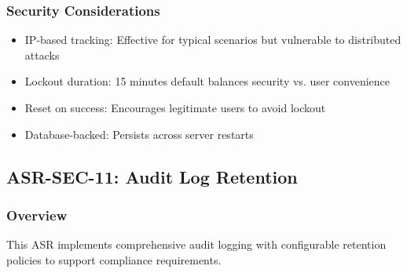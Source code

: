 \documentclass[12pt,oneside,a4paper]{article}
\begin{document}
\subsubsection{Security Considerations}
\begin{itemize}
    \item IP-based tracking: Effective for typical scenarios but vulnerable to distributed attacks
    \item Lockout duration: 15 minutes default balances security vs. user convenience
    \item Reset on success: Encourages legitimate users to avoid lockout
    \item Database-backed: Persists across server restarts
\end{itemize}

\subsection{ASR-SEC-11: Audit Log Retention}

\subsubsection{Overview}
This ASR implements comprehensive audit logging with configurable retention policies to support compliance requirements.
\end{document}
